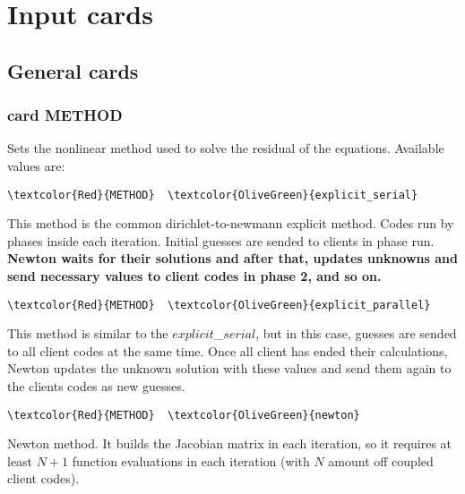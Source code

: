 \chapter{Input cards}




\section{General cards}

\subsection{card METHOD}

Sets the nonlinear method used to solve the residual of the equations. Available values are: 

\begin{Verbatim}[frame=single,commandchars=\\\{\}]
\textcolor{Red}{METHOD}  \textcolor{OliveGreen}{explicit_serial} 
\end{Verbatim}
This method is the common dirichlet-to-newmann explicit method. Codes run by phases inside each iteration. Initial guesses are sended to clients in phase run. \bf{Newton} waits for their solutions and after that, updates unknowns and send necessary values to client codes in phase 2, and so on.

\begin{Verbatim}[frame=single,commandchars=\\\{\}]
\textcolor{Red}{METHOD}  \textcolor{OliveGreen}{explicit_parallel} 
\end{Verbatim}
This method is similar to the $explicit$_$serial$, but in this case, guesses are sended to all client codes at the same time. Once all client has ended their calculations, Newton updates the unknown solution with these values and send them again to the clients codes as new guesses.

\begin{Verbatim}[frame=single,commandchars=\\\{\}]
\textcolor{Red}{METHOD}  \textcolor{OliveGreen}{newton} 
\end{Verbatim}
Newton method. It builds the Jacobian matrix in each iteration, so it requires at least $N+1$ function evaluations in each iteration (with $N$ amount off coupled client codes).

